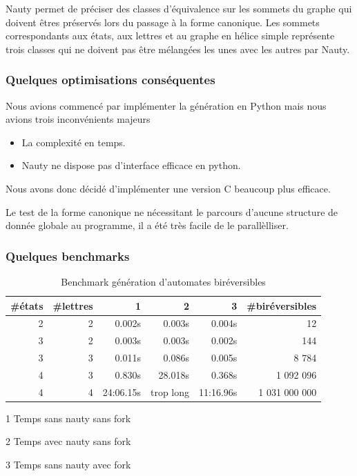 \documentclass[11pt,a4paper]{article}
\begin{document}
Nauty permet de préciser des classes d'équivalence sur les sommets du graphe qui doivent êtres préservés lors du passage à la forme canonique. Les sommets correspondants aux états, aux lettres et au graphe en hélice simple représente trois classes qui ne doivent pas être mélangées les unes avec les autres par \textrm{Nauty}.

\subsubsection*{Quelques optimisations conséquentes}
Nous avions commencé par implémenter la génération en \textrm{Python} mais nous avions trois inconvénients majeurs
\begin{itemize}
\item La complexité en temps.
\item \textrm{Nauty} ne dispose pas d'interface efficace en python.
\end{itemize}

Nous avons donc décidé d'implémenter une version C beaucoup plus efficace.

Le test de la forme canonique ne nécessitant le parcours d'aucune structure de donnée globale au programme, il a été très facile de le parallèlliser.

\subsubsection*{Quelques benchmarks}

\begin{center}
  \begin{table}[h!]
    \begin{threeparttable}
    \begin{tabular}{|rrrrrr|}
      \hline
      \#états & \#lettres & 1 & 2 & 3 & \#biréversibles \\ [0.5ex]
      \hline\hline
      2 & 2 & 0.002s & 0.003s & 0.004s & 12 \\
      \hline
      3 & 2 & 0.003s & 0.003s & 0.002s & 144 \\
      \hline
      3 & 3 & 0.011s & 0.086s & 0.005s & 8 784 \\
      \hline
      4 & 3 & 0.830s & 28.018s & 0.368s & 1 092 096 \\
      \hline
      4 & 4 & 24:06.15s & trop long & 11:16.96s & 1 031 000 000 \\
      \hline
    \end{tabular}

    \caption{Benchmark génération d'automates biréversibles}
    \begin{tablenotes}
    \item[1] Temps sans nauty sans fork
    \item[2] Temps avec nauty sans fork
    \item[3] Temps sans nauty avec fork
    \end{tablenotes}
\end{threeparttable}
  \end{table}
\end{center}
\end{document}
